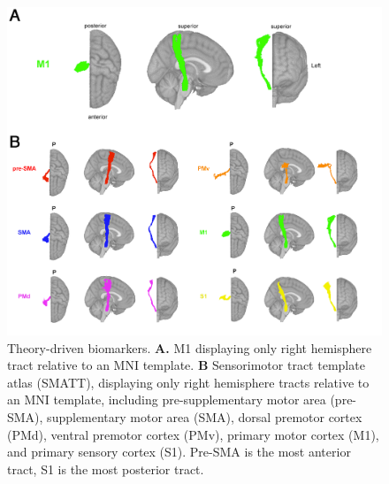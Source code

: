\documentclass[10pt]{article}
\begin{document}
\begin{figure}[htp]
\centering
\includegraphics[width=1\linewidth]{figures/theory_driven_rois.png}
\caption{Theory-driven biomarkers. \textbf{A.} M1 displaying only right hemisphere tract relative to an MNI template. \textbf{B} Sensorimotor tract template atlas (SMATT), displaying only right hemisphere tracts relative to an MNI template, including pre-supplementary motor area (pre-SMA), supplementary motor area (SMA), dorsal premotor cortex (PMd), ventral premotor cortex (PMv),  primary motor cortex (M1), and primary sensory cortex (S1). Pre-SMA is the most anterior tract, S1 is the most posterior tract. }
\label{theorybased}
\end{figure}
\end{document}
